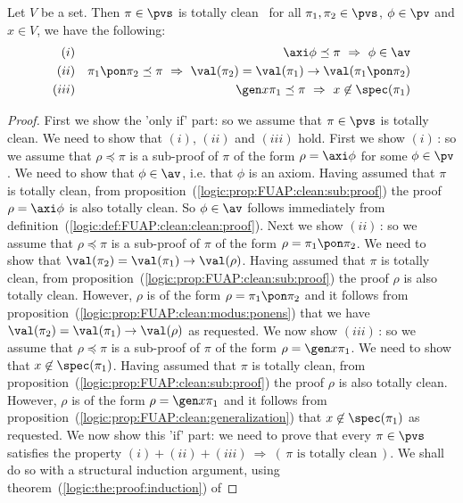 \begin{prop}\label{logic:prop:FUAP:clean:characterization}
Let $V$ be a set. Then $\pi\in\pvs$ is totally clean \ifand\ for all
$\pi_{1},\pi_{2}\in\pvs$, $\phi\in\pv$ and $x\in V$, we have the
following:
    \begin{eqnarray*}
    (i)&&\axi\phi\preceq\pi\ \Rightarrow\ \phi\in\av\\
    (ii)&&\pi_{1}\pon\pi_{2}\preceq\pi\ \Rightarrow\
    \val(\pi_{2})=\val(\pi_{1})\to\val(\pi_{1}\pon\pi_{2})\\
    (iii)&&\gen x\pi_{1}\preceq\pi\ \Rightarrow\
    x\not\in\spec(\pi_{1})
    \end{eqnarray*}
\end{prop}
\begin{proof}
First we show the 'only if' part: so we assume that $\pi\in\pvs$ is
totally clean. We need to show that $(i)$, $(ii)$ and $(iii)$ hold.
First we show $(i)$\,: so we assume that $\rho\preceq\pi$ is a
sub-proof of $\pi$ of the form $\rho=\axi\phi$ for some
$\phi\in\pv$. We need to show that $\phi\in\av$, i.e. that $\phi$ is
an axiom. Having assumed that $\pi$ is totally clean, from
proposition~(\ref{logic:prop:FUAP:clean:sub:proof}) the proof
$\rho=\axi\phi$ is also totally clean. So $\phi\in\av$ follows
immediately from
definition~(\ref{logic:def:FUAP:clean:clean:proof}). Next we show
$(ii)$\,: so we assume that $\rho\preceq\pi$ is a sub-proof of $\pi$
of the form $\rho=\pi_{1}\pon\pi_{2}$. We need to show that
$\val(\pi_{2})=\val(\pi_{1})\to\val(\rho)$. Having assumed that
$\pi$ is totally clean, from
proposition~(\ref{logic:prop:FUAP:clean:sub:proof}) the proof $\rho$
is also totally clean. However, $\rho$ is of the form
$\rho=\pi_{1}\pon\pi_{2}$ and it follows from
proposition~(\ref{logic:prop:FUAP:clean:modus:ponens}) that we have
$\val(\pi_{2})=\val(\pi_{1})\to\val(\rho)$ as requested. We now show
$(iii)$\,: so we assume that $\rho\preceq\pi$ is a sub-proof of
$\pi$ of the form $\rho=\gen x\pi_{1}$. We need to show that
$x\not\in\spec(\pi_{1})$. Having assumed that $\pi$ is totally
clean, from proposition~(\ref{logic:prop:FUAP:clean:sub:proof}) the
proof $\rho$ is also totally clean. However, $\rho$ is of the form
$\rho=\gen x\pi_{1}$ and it follows from
proposition~(\ref{logic:prop:FUAP:clean:generalization}) that
$x\not\in\spec(\pi_{1})$ as requested. We now show this 'if' part:
we need to prove that every $\pi\in\pvs$ satisfies the property
$(i)+(ii)+(iii)\ \Rightarrow\ (\,\pi\mbox{\ is totally clean}\,)$.
We shall do so with a structural induction argument, using
theorem~(\ref{logic:the:proof:induction}) of

\end{proof}
